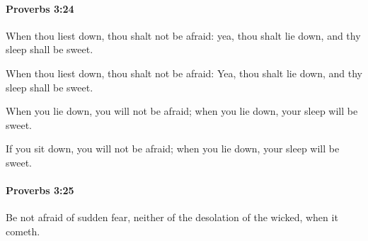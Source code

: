 		\paragraph{Proverbs 3:24} %
			\label{PROVERBS-3-24}

			When thou liest down, thou shalt not be afraid: yea, thou shalt lie down, and thy sleep shall be sweet.

			\begin{versebox}
					\item[BHS] 
					\item[ASV] When thou liest down, thou shalt not be afraid: Yea, thou shalt lie down, and thy sleep shall be sweet.
					\item[NIV] When you lie down, you will not be afraid; when you lie down, your sleep will be sweet.
					\item[NRSV] If you sit down, you will not be afraid; when you lie down, your sleep will be sweet.
			\end{versebox}

		\paragraph{Proverbs 3:25} %
			\label{PROVERBS-3-25}

			Be not afraid of sudden fear, neither of the desolation of the wicked, when it cometh.

